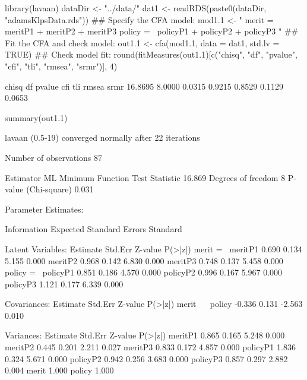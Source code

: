 \begin{Schunk}
\begin{Sinput}
 library(lavaan)
 dataDir <- "../data/"
 dat1 <- readRDS(paste0(dataDir, "adamsKlpsData.rds"))
 ## Specify the CFA model:
 mod1.1 <- "
 merit =~ meritP1 + meritP2 + meritP3
 policy =~ policyP1 + policyP2 + policyP3
 "
 ## Fit the CFA and check model:
 out1.1 <- cfa(mod1.1, data = dat1, std.lv = TRUE)
 ## Check model fit:
 round(fitMeasures(out1.1)[c("chisq", "df", "pvalue", "cfi", 
                             "tli", "rmsea", "srmr")], 4)
\end{Sinput}
\begin{Soutput}
  chisq      df  pvalue     cfi     tli   rmsea    srmr 
16.8695  8.0000  0.0315  0.9215  0.8529  0.1129  0.0653 
\end{Soutput}
\begin{Sinput}
 summary(out1.1)
\end{Sinput}
\begin{Soutput}
lavaan (0.5-19) converged normally after  22 iterations

  Number of observations                            87

  Estimator                                         ML
  Minimum Function Test Statistic               16.869
  Degrees of freedom                                 8
  P-value (Chi-square)                           0.031

Parameter Estimates:

  Information                                 Expected
  Standard Errors                             Standard

Latent Variables:
                   Estimate  Std.Err  Z-value  P(>|z|)
  merit =~                                            
    meritP1           0.690    0.134    5.155    0.000
    meritP2           0.968    0.142    6.830    0.000
    meritP3           0.748    0.137    5.458    0.000
  policy =~                                           
    policyP1          0.851    0.186    4.570    0.000
    policyP2          0.996    0.167    5.967    0.000
    policyP3          1.121    0.177    6.339    0.000

Covariances:
                   Estimate  Std.Err  Z-value  P(>|z|)
  merit ~~                                            
    policy           -0.336    0.131   -2.563    0.010

Variances:
                   Estimate  Std.Err  Z-value  P(>|z|)
    meritP1           0.865    0.165    5.248    0.000
    meritP2           0.445    0.201    2.211    0.027
    meritP3           0.833    0.172    4.857    0.000
    policyP1          1.836    0.324    5.671    0.000
    policyP2          0.942    0.256    3.683    0.000
    policyP3          0.857    0.297    2.882    0.004
    merit             1.000                           
    policy            1.000                           
\end{Soutput}
\end{Schunk}
